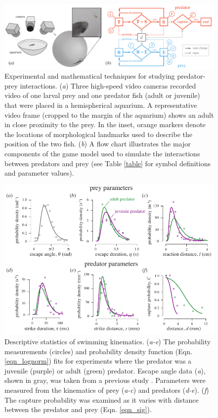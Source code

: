 \documentclass[]{rsos}%
\begin{document}
\pagebreak

\linespread{1}\selectfont %


\begin{figure}[!h]
\centering
	\includegraphics[width=5.5in]{fig_setup}
\caption{Experimental and mathematical techniques for studying predator-prey interactions. 
(\textit{a}) Three high-speed video cameras recorded video of one larval prey and one predator fish (adult or juvenile) that were placed in a hemispherical aquarium. 
A representative video frame (cropped to the margin of the aquarium) shows an adult in close proximity to the prey. 
In the inset, orange markers denote the locations of morphological landmarks used to describe the position of the two fish.
 (\textit{b}) A flow chart illustrates the major components of the game model used to simulate the interactions between predators and prey (see Table \ref{table} for symbol definitions and parameter values).}
\label{fig_setup}
\end{figure}

\pagebreak

\begin{figure}[!h]
\centering
	\includegraphics[width=5.5in]{fig_PDFs}
\caption{Descriptive statistics of swimming kinematics. 
(\textit{a-e}) The probability measurements (circles) and probability density function (Eqn. \ref{eqn_lognorm}) fits for experiments where the predator was a juvenile (purple) or adult (green) predator.
Escape angle data (\textit{a}), shown in gray, was taken from a previous study \cite{Stewart:2014cma}. 
Parameters were measured from the kinematics of prey (\textit{a-c}) and predators (\textit{d-e}).
(\textit{f}) The capture probability was examined as it varies with distance between the predator and prey (Eqn. \ref{eqn_sig}).  
}
\label{fig_PDF}
\end{figure}
\end{document}
